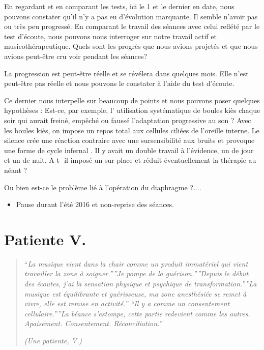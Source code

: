En regardant et en comparant les tests, ici le 1\textdegree{} et le
dernier en date, nous pouvons constater qu'il n'y a pas eu d'évolution
marquante. Il semble n'avoir pas ou très peu progressé. En comparant
le travail des séances avec celui reflété par le test d'écoute, nous
pouvons nous interroger sur notre travail actif et musicothérapeutique.
Quels sont les progrès que nous avions projetés et que nous avions
peut-être cru voir pendant les séances? 

La progression est peut-être réelle et se révélera dans quelques mois.
Elle n'est peut-être pas réelle et nous pouvons le constater à l'aide
du test d'écoute. 

Ce dernier nous interpelle sur beaucoup de points et nous pouvons
poser quelques hypothèses : Est-ce, par exemple, l' utilisation systématique
de boules kiès chaque soir qui aurait freiné, empêché ou faussé l'adaptation
progressive au son ? Avec les boules kiès, on impose un repos total
aux cellules ciliées de l'oreille interne. Le silence crée une réaction
contraire avec une sursensibilité aux bruits et provoque une forme
de cycle infernal . Il y avait un double travail à l'évidence, un
de jour et un de nuit. A-t- il imposé un sur-place et réduit éventuellement
la thérapie au néant ?

Ou bien est-ce le problème lié à l'opération du diaphragme ?....
\begin{itemize}
\item Pause durant l'été 2016 et non-reprise des séances.
\end{itemize}

\section{Patiente V. }
\begin{quotation}
``\emph{La musique vient dans la chair comme un produit immatériel
qui vient travailler la zone à soigner.''{}''Je pompe de la guérison.''{}''Depuis
le début des écoutes, j'ai la sensation physique et psychique de transformation.''{}''La
musique est équilibrante et guérisseuse, ma zone anesthésiée se remet
à vivre, elle est remise en activité.'' ``Il y a comme un consentement
cellulaire.''{}''La béance s'estompe, cette partie} \emph{redevient
comme les autres. Apaisement. Consentement. Réconciliation.''}

\emph{(Une patiente, V.)}

\emph{}
\begin{figure}[tph]
\end{figure}
\end{quotation}
